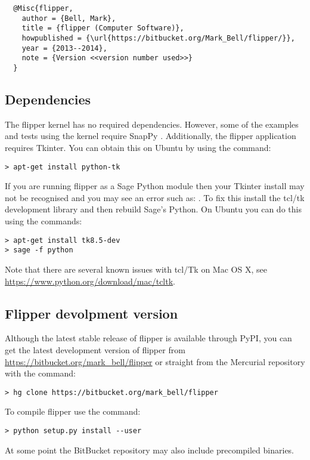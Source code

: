 \documentclass[a4paper]{article}
\newcommand{\exc}[1]{\mbox{\PVerb{#1}}}
\begin{document}
\begin{minipage}{\linewidth}
\begin{verbatim}
  @Misc{flipper,
    author = {Bell, Mark},
    title = {flipper (Computer Software)},
    howpublished = {\url{https://bitbucket.org/Mark_Bell/flipper/}},
    year = {2013--2014},
    note = {Version <<version number used>>}
  }
\end{verbatim}
\end{minipage}

\subsection{Dependencies}

The flipper kernel has no required dependencies. However, some of the examples and tests using the kernel require SnapPy \cite{SnapPy}. Additionally, the flipper application requires Tkinter. You can obtain this on Ubuntu by using the command:
\begin{lstlisting}
> apt-get install python-tk
\end{lstlisting}
If you are running flipper as a Sage Python module then your Tkinter install may not be recognised and you may see an error such as: \exc{Error: no module named _tkinter}. To fix this install the tcl/tk development library and then rebuild Sage's Python. On Ubuntu you can do this using the commands:
\begin{lstlisting}
> apt-get install tk8.5-dev
> sage -f python
\end{lstlisting}
Note that there are several known issues with tcl/Tk on Mac OS X, see \url{https://www.python.org/download/mac/tcltk}.

\subsection{Flipper devolpment version}
Although the latest stable release of flipper is available through PyPI, you can get the latest development version of flipper from \url{https://bitbucket.org/mark_bell/flipper} or straight from the Mercurial \cite{mercurial} repository with the command:
\begin{lstlisting}
> hg clone https://bitbucket.org/mark_bell/flipper
\end{lstlisting}
To compile flipper use the command:
\begin{lstlisting}
> python setup.py install --user
\end{lstlisting}

At some point the BitBucket repository may also include precompiled binaries.
\end{document}
